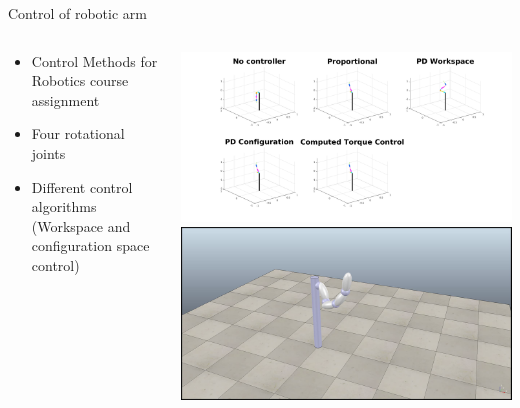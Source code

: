 \documentclass{beamer}
\begin{document}
\begin{frame}{Control of robotic arm}
	\begin{columns}
		\begin{column}{0.5\textwidth}
			\begin{itemize}\setlength\itemsep{2.5em}
			\item Control Methods for Robotics course assignment
			\item Four rotational joints
			\item Different control algorithms (Workspace and configuration space control)
			\end{itemize}
		\end{column}
		\begin{column}{0.5\textwidth}\centering
			\includegraphics[height = 0.55\textwidth]{Robot.png} \\
			\includegraphics[height=0.5\textwidth]{recording2.png}
		\end{column}
	\end{columns}
\end{frame}

			
\end{document}
